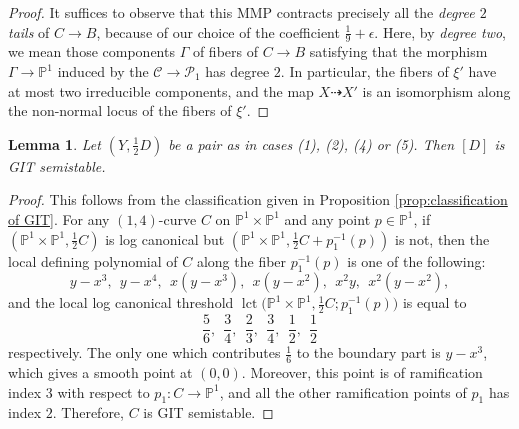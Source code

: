 \documentclass[a4paper,12pt]{amsart}
\DeclareMathOperator{\lct}{lct}
\newcommand{\bP}{{\mathbb P}}
\newcommand{\sP}{{\mathscr{P}}}
\newcommand\cC{{\mathcal{C}}}
\newtheorem{lemma}[theorem]{Lemma}
\theoremstyle{definition}
\theoremstyle{remark}
\begin{document}
\begin{proof}
It suffices to observe that this MMP contracts precisely all the \emph{degree $2$ tails} of $C\rightarrow B$, because of our choice of the coefficient $\frac{1}{9}+\epsilon$. Here, by \emph{degree two}, we mean those components $\Gamma$ of fibers of $C\rightarrow B$ satisfying that the morphism $\Gamma\rightarrow \bP^1$ induced by the $\cC\rightarrow \sP_1$ has degree $2$. In particular, the fibers of $\xi'$ have at most two irreducible components, and the map $X\dashrightarrow X'$ is an isomorphism along the non-normal locus of the fibers of $\xi'$.
\end{proof}


\begin{lemma}\label{lct}
    Let $(Y,\frac{1}{2}D)$ be a pair as in  cases (1), (2), (4) or (5). Then $[D]$ is GIT semistable.
\end{lemma}
\begin{proof}
    This follows from the classification given in Proposition \ref{prop:classification of GIT}. For any $(1,4)$-curve $C$ on $\bP^1\times\bP^1$ and any point $p\in \bP^1$, if $(\bP^1\times\bP^1,\frac{1}{2}C)$ is log canonical but $(\bP^1\times\bP^1,\frac{1}{2}C+p_1^{-1}(p))$ is not, then the local defining polynomial of $C$ along the fiber $p_1^{-1}(p)$ is one of the following: $$y-x^3,\ \ y-x^4, \ \ x(y-x^3), \ \ x(y-x^2), \ \ x^2y, \ \ x^2(y-x^2),$$ and the local log canonical threshold $\lct\big(\bP^1\times\bP^1,\frac{1}{2}C;p_1^{-1}(p)\big)$ is equal to $$\textstyle \frac{5}{6}, \ \ \frac{3}{4}, \ \ \frac{2}{3}, \ \ \frac{3}{4}, \ \ \frac{1}{2}, \ \ \frac{1}{2}$$ respectively. The only one which contributes $\frac{1}{6}$ to the boundary part is $y-x^3$, which gives a smooth point at $(0,0)$. Moreover, this point is of ramification index $3$ with respect to $p_1:C\rightarrow \bP^1$, and all the other ramification points of $p_1$ has index $2$. Therefore, $C$ is GIT semistable.
\end{proof}
\end{document}
